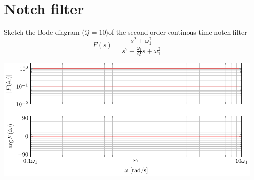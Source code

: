 \documentclass[letterpaper]{scrartcl}
\begin{document}
\section*{Notch filter}
\label{sec-4}
Sketch the Bode diagram (\(Q=10\))of the second order continous-time notch filter
\[ F(s) = \frac{s^2 + \omega_1^2}{s^2 + \frac{\omega_1}{Q}s + \omega_1^2} \]

\begin{center}
\includegraphics[width=0.85\linewidth]{../figures/bode-notch-empty}
\end{center}
\end{document}
